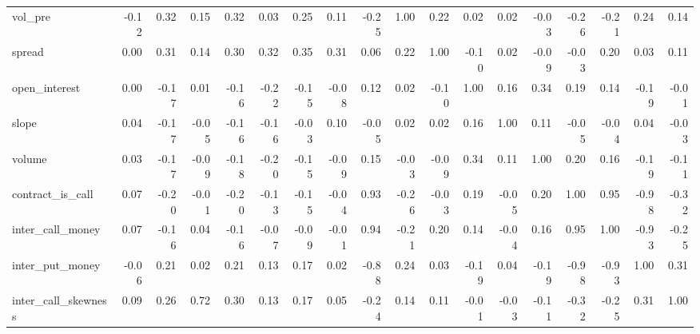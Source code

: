 \begin{tabular}{lrrrrrrrrrrrrrrrrr}
vol\_pre             &    -0.12 &        0.32 &      0.15 &    0.32 &          0.03 &        0.25 &  0.11 &          -0.25 &     1.00 &    0.22 &           0.02 &   0.02 &   -0.03 &             -0.26 &             -0.21 &             0.24 &                 0.14 \\
spread              &     0.00 &        0.31 &      0.14 &    0.30 &          0.32 &        0.35 &  0.31 &           0.06 &     0.22 &    1.00 &          -0.10 &   0.02 &   -0.09 &             -0.03 &              0.20 &             0.03 &                 0.11 \\
open\_interest       &     0.00 &       -0.17 &      0.01 &   -0.16 &         -0.22 &       -0.15 & -0.08 &           0.12 &     0.02 &   -0.10 &           1.00 &   0.16 &    0.34 &              0.19 &              0.14 &            -0.19 &                -0.01 \\
slope               &     0.04 &       -0.17 &     -0.05 &   -0.16 &         -0.16 &       -0.03 &  0.10 &          -0.05 &     0.02 &    0.02 &           0.16 &   1.00 &    0.11 &             -0.05 &             -0.04 &             0.04 &                -0.03 \\
volume              &     0.03 &       -0.17 &     -0.09 &   -0.18 &         -0.20 &       -0.15 & -0.09 &           0.15 &    -0.03 &   -0.09 &           0.34 &   0.11 &    1.00 &              0.20 &              0.16 &            -0.19 &                -0.11 \\
contract\_is\_call    &     0.07 &       -0.20 &     -0.01 &   -0.20 &         -0.13 &       -0.15 & -0.04 &           0.93 &    -0.26 &   -0.03 &           0.19 &  -0.05 &    0.20 &              1.00 &              0.95 &            -0.98 &                -0.32 \\
inter\_call\_money    &     0.07 &       -0.16 &      0.04 &   -0.16 &         -0.07 &       -0.09 & -0.01 &           0.94 &    -0.21 &    0.20 &           0.14 &  -0.04 &    0.16 &              0.95 &              1.00 &            -0.93 &                -0.25 \\
inter\_put\_money     &    -0.06 &        0.21 &      0.02 &    0.21 &          0.13 &        0.17 &  0.02 &          -0.88 &     0.24 &    0.03 &          -0.19 &   0.04 &   -0.19 &             -0.98 &             -0.93 &             1.00 &                 0.31 \\
inter\_call\_skewness &     0.09 &        0.26 &      0.72 &    0.30 &          0.13 &        0.17 &  0.05 &          -0.24 &     0.14 &    0.11 &          -0.01 &  -0.03 &   -0.11 &             -0.32 &             -0.25 &             0.31 &                 1.00 \\
\bottomrule
\end{tabular}
